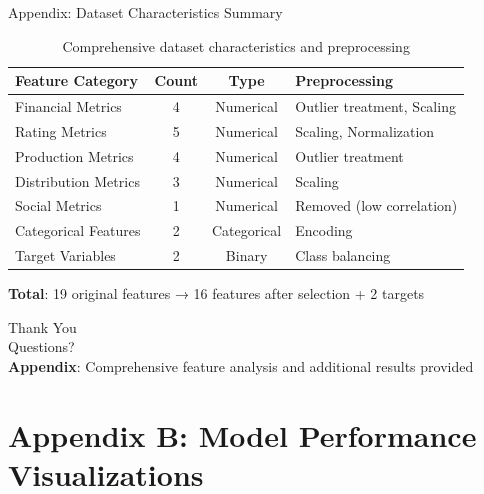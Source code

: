 \documentclass[10pt]{beamer}
\begin{document}
{\begin{frame}{Appendix: Dataset Characteristics Summary}
\begin{table}
\centering
\scriptsize
\begin{tabular}{p{4cm}ccp{3cm}}
\toprule
\textbf{Feature Category} & \textbf{Count} & \textbf{Type} & \textbf{Preprocessing} \\
\midrule
Financial Metrics & 4 & Numerical & Outlier treatment, Scaling \\
Rating Metrics & 5 & Numerical & Scaling, Normalization \\
Production Metrics & 4 & Numerical & Outlier treatment \\
Distribution Metrics & 3 & Numerical & Scaling \\
Social Metrics & 1 & Numerical & Removed (low correlation) \\
Categorical Features & 2 & Categorical & Encoding \\
Target Variables & 2 & Binary & Class balancing \\
\bottomrule
\end{tabular}
\caption{Comprehensive dataset characteristics and preprocessing}
\end{table}

\begin{center}
\textbf{Total}: 19 original features → 16 features after selection + 2 targets
\end{center}
\end{frame}

\begin{frame}{}
\begin{center}
\Huge \textcolor{primary}{Thank You}\\
\vspace{1cm}
\large \textcolor{primary}{Questions?}\\
\vspace{2cm}
\textbf{Appendix}: Comprehensive feature analysis and additional results provided
\end{center}
\end{frame}




\section{Appendix B: Model Performance Visualizations}

}
\end{document}
